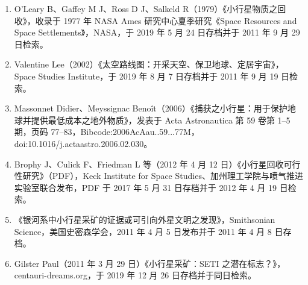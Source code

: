 \begin{enumerate}
\item O'Leary B、Gaffey M J、Ross D J、Salkeld R（1979）《小行星物质之回收》，收录于 1977 年 NASA Ames 研究中心夏季研究《Space Resources and Space Settlements》，NASA，于 2019 年 5 月 24 日存档并于 2011 年 9 月 29 日检索。

\item Valentine Lee（2002）《太空路线图：开采天空、保卫地球、定居宇宙》，Space Studies Institute，于 2019 年 8 月 7 日存档并于 2011 年 9 月 19 日检索。

\item Massonnet Didier、Meyssignac Benoît（2006）《捕获之小行星：用于保护地球并提供最低成本之地外物质》，发表于 Acta Astronautica 第 59 卷第 1–5 期，页码 77–83，Bibcode:2006AcAau..59...77M，doi:10.1016/j.actaastro.2006.02.030。

\item Brophy J、Culick F、Friedman L 等（2012 年 4 月 12 日）《小行星回收可行性研究》（PDF），Keck Institute for Space Studies、加州理工学院与喷气推进实验室联合发布，PDF 于 2017 年 5 月 31 日存档并于 2012 年 4 月 19 日检索。

\item 《银河系中小行星采矿的证据或可引向外星文明之发现》，Smithsonian Science，美国史密森学会，2011 年 4 月 5 日发布并于 2011 年 4 月 8 日存档。

\item Gilster Paul（2011 年 3 月 29 日）《小行星采矿：SETI 之潜在标志？》，centauri-dreams.org，于 2019 年 12 月 26 日存档并于同日检索。

\end{enumerate}
